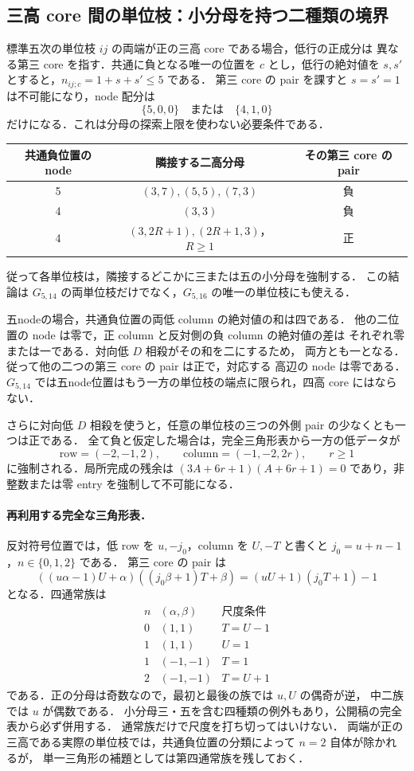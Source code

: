 \subsection{三高 core 間の単位枝：小分母を持つ二種類の境界}
\label{nu24:unit-three-high}

標準五次の単位枝 $ij$ の両端が正の三高 core である場合，低行の正成分は
異なる第三 core を指す．共通に負となる唯一の位置を $c$ とし，低行の絶対値を
$s,s'$ とすると，$n_{ij;c}=1+s+s'\le5$ である．
第三 core の pair を課すと $s=s'=1$ は不可能になり，node 配分は
\[
 \{5,0,0\}\quad\text{または}\quad\{4,1,0\}
\]
だけになる．これは分母の探索上限を使わない必要条件である．

\begin{center}\small
\begin{tabular}{c|c|c}
共通負位置の node&隣接する二高分母&その第三 core の pair\\\hline
5&$(3,7),(5,5),(7,3)$&負\\
4&$(3,3)$&負\\
4&$(3,2R+1),(2R+1,3)$，$R\ge1$&正
\end{tabular}
\end{center}
従って各単位枝は，隣接するどこかに三または五の小分母を強制する．
この結論は $G_{5,14}$ の両単位枝だけでなく，$G_{5,16}$ の唯一の単位枝にも使える．

五nodeの場合，共通負位置の両低 column の絶対値の和は四である．
他の二位置の node は零で，正 column と反対側の負 column の絶対値の差は
それぞれ零または一である．対向低 $D$ 相殺がその和を二にするため，
両方とも一となる．従って他の二つの第三 core の pair は正で，対応する
高辺の node は零である．
$G_{5,14}$ では五node位置はもう一方の単位枝の端点に限られ，四高 core にはならない．

さらに対向低 $D$ 相殺を使うと，任意の単位枝の三つの外側 pair の少なくとも一つは正である．
全て負と仮定した場合は，完全三角形表から一方の低データが
\[
 \text{row}=(-2,-1,2),\qquad\text{column}=(-1,-2,2r),\qquad r\ge1
\]
に強制される．局所完成の残余は
$(3A+6r+1)(A+6r+1)=0$ であり，非整数または零 entry を強制して不可能になる．

\paragraph{再利用する完全な三角形表．}
反対符号位置では，低 row を $u,-j_0$，column を $U,-T$ と書くと
$j_0=u+n-1$，$n\in\{0,1,2\}$ である．
第三 core の pair は
\[
 ((u\alpha-1)U+\alpha)((j_0\beta+1)T+\beta)
   =(uU+1)(j_0T+1)-1
\]
となる．四通常族は
\[
\begin{array}{c|c|c}
 n&(\alpha,\beta)&尺度条件\\\hline
 0&(1,1)&T=U-1\\
 1&(1,1)&U=1\\
 1&(-1,-1)&T=1\\
 2&(-1,-1)&T=U+1
\end{array}
\]
である．正の分母は奇数なので，最初と最後の族では $u,U$ の偶奇が逆，
中二族では $u$ が偶数である．
小分母三・五を含む四種類の例外もあり，公開稿の完全表から必ず併用する．
通常族だけで尺度を打ち切ってはいけない．
両端が正の三高である実際の単位枝では，共通負位置の分類によって $n=2$ 自体が除かれるが，
単一三角形の補題としては第四通常族を残しておく．


